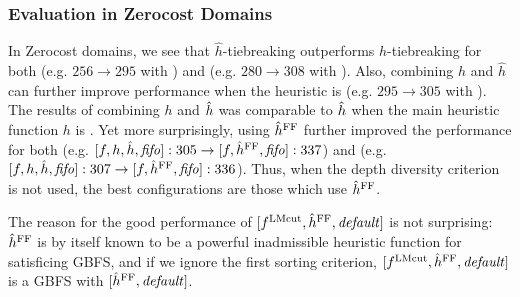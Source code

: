 \subsubsection{Evaluation in Zerocost Domains}

In Zerocost domains, we see that $\hat{h}$-tiebreaking outperforms $h$-tiebreaking for both \lmcut (e.g. $256\rightarrow 295$ with \fifo) and \mands (e.g. $280\rightarrow 308$ with \fifo).
Also, combining $h$ and $\hat{h}$ can further improve performance when the heuristic is \lmcut (e.g. $295\rightarrow 305$ with \fifo).
The results of combining $h$ and $\hat{h}$ was comparable to $\hat{h}$ when the main heuristic function $h$ is \mands.
% 
Yet more surprisingly, using $\hat{h}^{\text{FF}}$ further improved the performance for both \lmcut
(e.g. $[f,h,\hat{h},{\text{\textit{fifo}}}]:305 \rightarrow [f,\hat{h}^{\text{FF}},{\text{\textit{fifo}}}]:337$) and \mands 
(e.g. $[f,h,\hat{h},{\text{\textit{fifo}}}]:307 \rightarrow [f,\hat{h}^{\text{FF}},{\text{\textit{fifo}}}]:336$).
% 
Thus, when the depth diversity criterion  is not used, the best configurations are those
which use $\hat{h}^{\text{FF}}$.

The reason for the good performance of $[f^{\text{LMcut}},\hat{h}^{\text{FF}},{\text{\textit{default}}}]$ is not surprising:
$\hat{h}^{\text{FF}}$ is by itself known to be a powerful inadmissible heuristic
function for satisficing GBFS, and 
if we ignore the first sorting criterion, $[f^{\text{LMcut}},\hat{h}^{\text{FF}},{\text{\textit{default}}}]$ is a GBFS with $[\hat{h}^{\text{FF}},{\text{\textit{default}}}]$.

